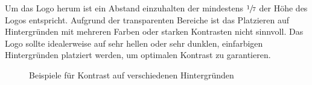 \documentclass{article}
\begin{document}
Um das Logo herum ist ein Abstand einzuhalten der mindestens $\sfrac{1}{7}$ der Höhe des Logos entspricht. Aufgrund der transparenten Bereiche ist das Platzieren auf Hintergründen mit mehreren Farben oder starken Kontrasten nicht sinnvoll. Das Logo sollte idealerweise auf sehr hellen oder sehr dunklen, einfarbigen Hintergründen platziert werden, um optimalen Kontrast zu garantieren.

\begin{figure}[H]
\begin{centering}
\hfill
{}
\hfill

\hfill
{}
\hfill
\end{centering}
\caption{Beispiele für Kontrast auf verschiedenen Hintergründen}
\end{figure}
\end{document}
